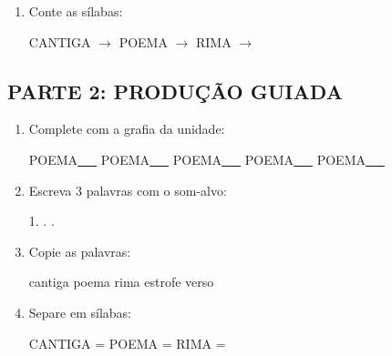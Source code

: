 \begin{exercicio}
\begin{enumerate}
  \item Conte as sílabas:
  \begin{center}
  CANTIGA $\rightarrow$ \underline{\hspace{0.9cm}} \quad POEMA $\rightarrow$ \underline{\hspace{0.9cm}} \quad RIMA $\rightarrow$ \underline{\hspace{0.9cm}}
  \end{center}

\end{enumerate}

\subsection*{PARTE 2: PRODUÇÃO GUIADA}

\begin{enumerate}[resume]

  \item Complete com a grafia da unidade:
  \begin{center}
  POEMA\underline{~~~} \quad POEMA\underline{~~~} \quad POEMA\underline{~~~} \quad POEMA\underline{~~~} \quad POEMA\underline{~~~}
  \end{center}

  \item Escreva 3 palavras com o som-alvo:
  \begin{center}
  1. \underline{\hspace{3cm}} . \underline{\hspace{3cm}} . \underline{\hspace{3cm}}
  \end{center}

  \item Copie as palavras:
  \begin{center}
  cantiga \quad poema \quad rima \quad estrofe \quad verso
  \end{center}

  \item Separe em sílabas:
  \begin{center}
  CANTIGA = \underline{\hspace{1cm}} \underline{\hspace{1cm}} \quad POEMA = \underline{\hspace{1cm}} \underline{\hspace{1cm}} \quad RIMA = \underline{\hspace{1cm}} \underline{\hspace{1cm}}
  \end{center}


\end{enumerate}
\end{exercicio}
